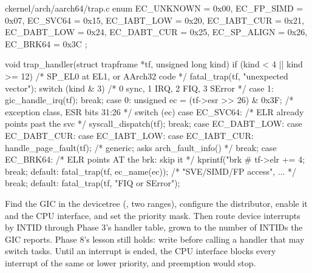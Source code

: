 \documentclass[11pt,a4paper]{article}
\begin{document}
\begin{lst}{c}{kernel/arch/aarch64/trap.c}
enum { EC_UNKNOWN = 0x00, EC_FP_SIMD = 0x07, EC_SVC64 = 0x15, EC_IABT_LOW = 0x20,
       EC_IABT_CUR = 0x21, EC_DABT_LOW = 0x24, EC_DABT_CUR = 0x25, EC_SP_ALIGN = 0x26,
       EC_BRK64 = 0x3C };

void trap_handler(struct trapframe *tf, unsigned long kind)
{
    if (kind < 4 || kind >= 12)                     /* SP_EL0 at EL1, or AArch32 code */
        fatal_trap(tf, "unexpected vector");
    switch (kind & 3) {                             /* 0 sync, 1 IRQ, 2 FIQ, 3 SError */
    case 1:
        gic_handle_irq(tf);
        break;
    case 0: {
        unsigned ec = (tf->esr >> 26) & 0x3F;       /* exception class, ESR bits 31:26 */
        switch (ec) {
        case EC_SVC64:                              /* ELR already points past the svc */
            syscall_dispatch(tf);
            break;
        case EC_DABT_LOW: case EC_DABT_CUR: case EC_IABT_LOW: case EC_IABT_CUR:
            handle_page_fault(tf);                  /* generic; asks arch_fault_info() */
            break;
        case EC_BRK64:                              /* ELR points AT the brk: skip it */
            kprintf("brk #%
            tf->elr += 4;
            break;
        default:
            fatal_trap(tf, ec_name(ec));            /* "SVE/SIMD/FP access", ... */
        }
        break;
    }
    default:
        fatal_trap(tf, "FIQ or SError");
    }
}
\end{lst}

Find the GIC in the devicetree (, two  ranges), configure the distributor, enable
it and the CPU interface, and set the priority mask. Then route device interrupts by INTID through Phase 3's handler
table, grown to the number of INTIDs the GIC reports. Phase 8's lesson still holds: write  before
calling a handler that may switch tasks. Until an interrupt is ended, the CPU interface blocks every interrupt of the same
or lower priority, and preemption would stop.
\end{document}
